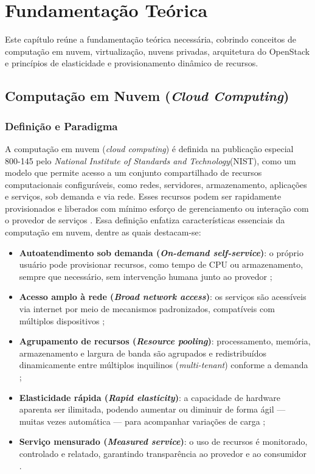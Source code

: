 \chapter{Fundamentação Teórica}
\setcounter{table}{0}

Este capítulo reúne a fundamentação teórica necessária, cobrindo conceitos de computação em nuvem, virtualização, nuvens privadas, arquitetura do OpenStack e princípios de elasticidade e provisionamento dinâmico de recursos.

\section{Computação em Nuvem (\textit{Cloud Computing})}
\label{sec:cloud-computing}

\subsection{Definição e Paradigma}

A computação em nuvem (\textit{cloud computing}) é definida na publicação especial 800-145 pelo \textit{National Institute of Standards and Technology}(NIST), como um modelo que permite acesso a um conjunto compartilhado de recursos computacionais configuráveis, como redes, servidores, armazenamento, aplicações e serviços,  sob demanda e via rede. Esses recursos podem ser rapidamente provisionados e liberados com mínimo esforço de gerenciamento ou interação com o provedor de serviços \cite{mell2011}. Essa definição enfatiza características essenciais da computação em nuvem, dentre as quais destacam-se:

\begin{itemize}
    \item \textbf{Autoatendimento sob demanda (\textit{On-demand self-service})}: o próprio usuário pode provisionar recursos, como tempo de CPU ou armazenamento, sempre que necessário, sem intervenção humana junto ao provedor \cite{mell2011};
    \item \textbf{Acesso amplo à rede (\textit{Broad network access})}: os serviços são acessíveis via internet por meio de mecanismos padronizados, compatíveis com múltiplos dispositivos \cite{mell2011};
    \item \textbf{Agrupamento de recursos (\textit{Resource pooling})}: processamento, memória, armazenamento e largura de banda são agrupados e redistribuídos dinamicamente entre múltiplos inquilinos (\textit{multi-tenant}) conforme a demanda \cite{mell2011};
    \item \textbf{Elasticidade rápida (\textit{Rapid elasticity})}: a capacidade de hardware aparenta ser ilimitada, podendo aumentar ou diminuir de forma ágil — muitas vezes automática — para acompanhar variações de carga \cite{mell2011};
    \item \textbf{Serviço mensurado (\textit{Measured service})}: o uso de recursos é monitorado, controlado e relatado, garantindo transparência ao provedor e ao consumidor \cite{mell2011}.
\end{itemize}


